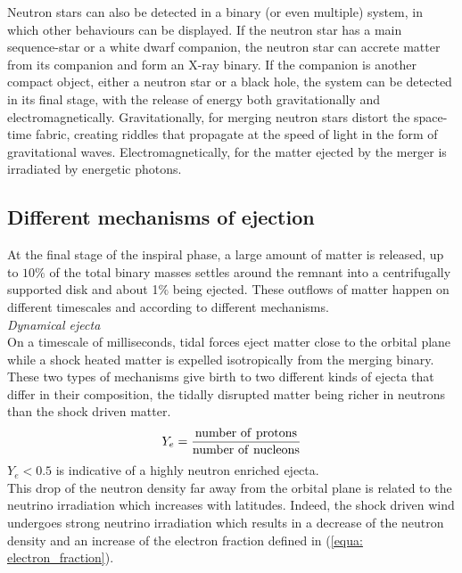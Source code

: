 \documentclass[a4paper, twoside, 11pt]{article}
\numberwithin{equation}{section}
\begin{document}
Neutron stars can also be detected in a binary (or even multiple) system, in which other behaviours can be displayed. If the neutron star has a main sequence-star or a white dwarf companion, the neutron star can {accrete} matter from its companion and form an  X-ray binary. If the companion is another compact object, either a neutron star or a black hole, the system can be detected in its final stage, with the release of energy both gravitationally and electromagnetically. Gravitationally,  for merging neutron stars distort the space-time fabric, creating riddles that propagate at the speed of light in the form of gravitational waves. Electromagnetically, for the matter ejected by the merger is irradiated by energetic photons. \\ 

\newpage
\subsection{Different mechanisms of ejection}
\label{subsec:ejection}
\hspace{\parindent}	 At the final stage of the inspiral phase, a large amount of matter is released, up to $10\%$ of the total binary masses settles around the remnant into a centrifugally supported disk and about 1$\%$ being ejected. These outflows of matter happen on different timescales and according to different mechanisms. \\

\textit{Dynamical ejecta}\\

On a timescale of milliseconds, tidal forces eject matter close to the orbital plane while a shock heated matter is expelled isotropically from the merging binary. These two types of mechanisms give birth to two different kinds of ejecta that differ in their composition, the tidally disrupted matter being richer in neutrons than the shock driven matter. 
\begin{equation}
  Y_{e} = \frac{\rm{number \ of \  protons}}{\rm{number \  of \ nucleons}}
  \label{equa: electron_fraction}
\end{equation}
 $Y_e < 0.5$ is indicative of a highly neutron enriched ejecta. \\
 
This drop of the neutron density far away from the orbital plane is related to the neutrino irradiation which increases with latitudes. Indeed, the shock driven wind undergoes strong neutrino irradiation which results in a decrease of the neutron density and an increase of the electron fraction defined in (\ref{equa: electron_fraction}). \\
\end{document}
